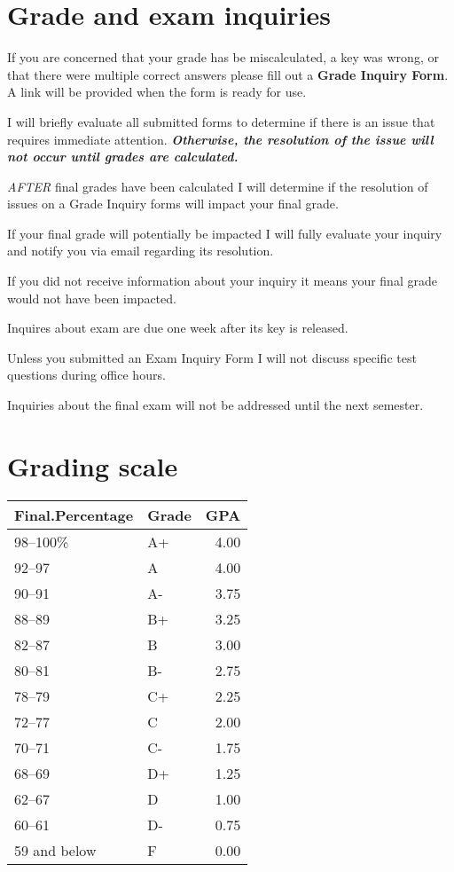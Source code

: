 \documentclass[
]{book}
\begin{document}
\hypertarget{grade-and-exam-inquiries}{%
\chapter{Grade and exam inquiries}\label{grade-and-exam-inquiries}}

If you are concerned that your grade has be miscalculated, a key was wrong, or that there were multiple correct answers please fill out a \textbf{Grade Inquiry Form}. A link will be provided when the form is ready for use.

I will briefly evaluate all submitted forms to determine if there is an issue that requires immediate attention. \textbf{\emph{Otherwise, the resolution of the issue will not occur until grades are calculated.}}

\emph{AFTER} final grades have been calculated I will determine if the resolution of issues on a Grade Inquiry forms will impact your final grade.

If your final grade will potentially be impacted I will fully evaluate your inquiry and notify you via email regarding its resolution.

If you did not receive information about your inquiry it means your final grade would not have been impacted.

Inquires about exam are due one week after its key is released.

Unless you submitted an Exam Inquiry Form I will not discuss specific test questions during office hours.

Inquiries about the final exam will not be addressed until the next semester.

\hypertarget{grading-scale}{%
\chapter{Grading scale}\label{grading-scale}}

\begin{tabular}{l|l|r}
\hline
Final.Percentage & Grade & GPA\\
\hline
98--100\% & A+ & 4.00\\
\hline
92--97 & A & 4.00\\
\hline
90--91 & A- & 3.75\\
\hline
88--89 & B+ & 3.25\\
\hline
82--87 & B & 3.00\\
\hline
80--81 & B- & 2.75\\
\hline
78--79 & C+ & 2.25\\
\hline
72--77 & C & 2.00\\
\hline
70--71 & C- & 1.75\\
\hline
68--69 & D+ & 1.25\\
\hline
62--67 & D & 1.00\\
\hline
60--61 & D- & 0.75\\
\hline
59 and below & F & 0.00\\
\hline
\end{tabular}
\end{document}
